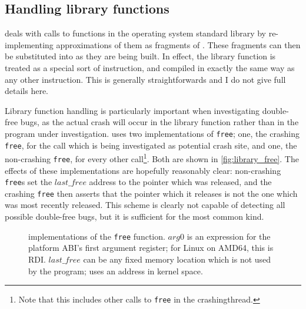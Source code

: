 \subsection{Handling library functions}
\label{sect:derive:library_functions}

{\Technique} deals with calls to functions in the operating system
standard library by re-implementing approximations of them as
fragments of {\StateMachine}.  These fragments can then be substituted
into {\StateMachines} as they are being built.  In effect, the library
function is treated as a special sort of instruction, and compiled in
exactly the same way as any other instruction.  This is generally
straightforwards and I do not give full details here.

Library function handling is particularly important when investigating
double-free bugs, as the actual crash will occur in the library
function rather than in the program under investigation.  {\Technique}
uses two implementations of \texttt{free}; one, the crashing
\texttt{free}, for the call which is being investigated as potential
crash site, and one, the non-crashing \texttt{free}, for every other
call\footnote{Note that this includes other calls to \texttt{free} in
  the \gls{crashingthread}.}.  Both are shown in
\autoref{fig:library_free}.  The effects of these implementations are
hopefully reasonably clear: non-crashing \texttt{free}s set the
$\mathit{last\_free}$ address to the pointer which was released, and
the crashing \texttt{free} then asserts that the pointer which it
releases is not the one which was most recently released.  This scheme
is clearly not capable of detecting all possible double-free bugs, but
it is sufficient for the most common kind.

\begin{figure}
  \vspace{-12pt}
  \caption{{\StateMachine} implementations of the \texttt{free}
    function. $arg0$ is an expression for the platform ABI's first
    argument register; for Linux on AMD64, this is RDI.
    $\mathit{last\_free}$ can be any fixed memory location which is
    not used by the program; {\implementation} uses an address in
    kernel space.}
  \label{fig:library_free}
\end{figure}

